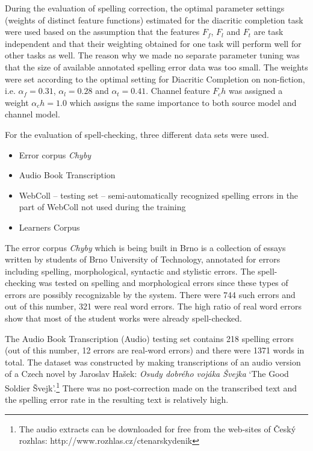 \documentclass[11pt]{article}
\begin{document}
During the evaluation of spelling correction, the optimal parameter settings
(weights of distinct feature functions) estimated for the diacritic completion
task were used based on the assumption that the features $F_f$, $F_l$ and $F_t$
are task independent and that their weighting obtained for one task will
perform well for other tasks as well. The reason why we made no separate
parameter tuning was that the size of available annotated spelling error data
was too small. The weights were set according to the optimal setting for
Diacritic Completion on non-fiction, i.e. $\alpha_f = 0.31$, $ \alpha_l = 0.28$
and $\alpha_t = 0.41$. Channel feature $F_ch$ was assigned a weight $\alpha_ch
= 1.0$ which assigns the same importance to both source model and channel
model.

For the evaluation of spell-checking, three different data sets were used.
%
\begin{itemize}
    \item Error corpus \emph{Chyby} \cite{pala:2003}
    \item Audio Book Transcription
    \item WebColl -- testing set -- semi-automatically recognized spelling errors in the part
      of WebColl not used during the training
    \item Learners Corpus
\end{itemize}
%

The error corpus \emph{Chyby} \cite{pala:2003} which is being built in Brno is
a collection of essays written by students of Brno University of Technology,
annotated for errors including spelling, morphological, syntactic and stylistic
errors. The spell-checking was tested on spelling and morphological errors
since these types of errors are possibly recognizable by the system. There were
744 such errors and out of this number, 321 were real word errors. The high
ratio of real word errors show that most of the student works were already
spell-checked.

The Audio Book Transcription (Audio) testing set contains 218 spelling errors (out of this number, 12 errors are
real-word errors) and there were 1371 words in total. The dataset was
constructed by making transcriptions of an audio version of a Czech novel by
Jaroslav Hašek: \emph{Osudy dobrého vojáka Švejka} `The Good Soldier Švejk'.\footnote{The audio extracts
can be downloaded for free from the web-sites of Český rozhlas:
http://www.rozhlas.cz/ctenarskydenik} There was no post-correction made on the
transcribed text and the spelling error rate in the resulting text is
relatively high.
\end{document}
